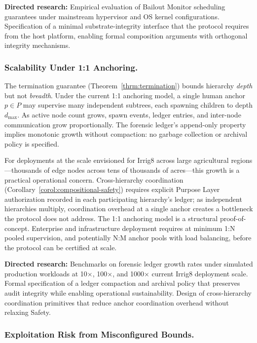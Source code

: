 \textbf{Directed research:} Empirical evaluation of Bailout Monitor scheduling guarantees under mainstream hypervisor and OS kernel configurations. Specification of a minimal substrate-integrity interface that the protocol requires from the host platform, enabling formal composition arguments with orthogonal integrity mechanisms.

\subsubsection{Scalability Under 1:1 Anchoring.}
\label{sec:limitations-scalability}

The termination guarantee (Theorem~\ref{thrm:termination}) bounds hierarchy \emph{depth} but not \emph{breadth}. Under the current 1:1 anchoring model, a single human anchor $p \in P$ may supervise many independent subtrees, each spawning children to depth $d_{\max}$. As active node count grows, spawn events, ledger entries, and inter-node communication grow proportionally. The forensic ledger's append-only property implies monotonic growth without compaction: no garbage collection or archival policy is specified.

For deployments at the scale envisioned for Irrig8 across large agricultural regions---thousands of edge nodes across tens of thousands of acres---this growth is a practical operational concern. Cross-hierarchy coordination (Corollary~\ref{corol:compositional-safety}) requires explicit Purpose Layer authorization recorded in each participating hierarchy's ledger; as independent hierarchies multiply, coordination overhead at a single anchor creates a bottleneck the protocol does not address. The 1:1 anchoring model is a structural proof-of-concept. Enterprise and infrastructure deployment requires at minimum 1:N pooled supervision, and potentially N:M anchor pools with load balancing, before the protocol can be certified at scale.

\textbf{Directed research:} Benchmarks on forensic ledger growth rates under simulated production workloads at 10$\times$, 100$\times$, and 1000$\times$ current Irrig8 deployment scale. Formal specification of a ledger compaction and archival policy that preserves audit integrity while enabling operational sustainability. Design of cross-hierarchy coordination primitives that reduce anchor coordination overhead without relaxing Safety.

\subsubsection{Exploitation Risk from Misconfigured Bounds.}
\label{sec:limitations-exploitation}

